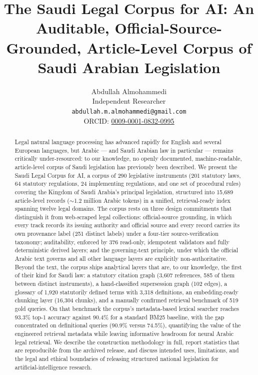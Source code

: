 \documentclass[sn-basic]{sn-jnl}%
\title{The Saudi Legal Corpus for AI: An Auditable,
Official-Source-Grounded, Article-Level Corpus of Saudi Arabian
Legislation}
\author*[1]{\fnm{Abdullah} \sur{Almohammedi}}\email{abdullah.m.almohammedi@gmail.com}
\affil[1]{\orgname{Independent Researcher}}
\author{Abdullah Almohammedi \\
    Independent Researcher \\
    \texttt{abdullah.m.almohammedi@gmail.com} \\
    ORCID: \href{https://orcid.org/0009-0001-0832-0995}{0009-0001-0832-0995}}
\date{}
\newcommand{\corpusname}{Saudi Legal Corpus for AI}
\begin{document}
\maketitle

\begin{abstract}
Legal natural language processing has advanced rapidly for English and
several European languages, but Arabic --- and Saudi Arabian law in
particular --- remains critically under-resourced: to our knowledge, no
openly documented, machine-readable, article-level corpus of Saudi
legislation has previously been described. We present the \corpusname, a
corpus of 290 legislative instruments (201 statutory laws, 64 statutory
regulations, 24 implementing regulations, and one set of procedural rules)
covering the Kingdom of Saudi Arabia's principal legislation, structured
into 15{,}689 article-level records ($\sim$1.2 million Arabic tokens) in a
unified, retrieval-ready index spanning twelve legal domains. The corpus
rests on three design commitments that distinguish it from web-scraped
legal collections: official-source grounding, in which every track records
its issuing authority and official source and every record carries its own
provenance label (251 distinct labels) under a four-tier source-verification
taxonomy; auditability, enforced by 376 read-only, idempotent validators and
fully deterministic derived layers; and the governing-text principle, under
which the official Arabic text governs and all other language layers are
explicitly non-authoritative. Beyond the text, the corpus ships analytical
layers that are, to our knowledge, the first of their kind for Saudi law: a
statutory citation graph (3{,}607 references, 585 of them between distinct
instruments), a hand-classified supersession graph (102 edges), a glossary
of 1{,}920 statutorily defined terms with 3{,}318 definitions, an
embedding-ready chunking layer (16{,}304 chunks), and a manually confirmed
retrieval benchmark of 519 gold queries. On that benchmark the corpus's
metadata-based lexical searcher reaches 93.3\% top-1 accuracy against 90.4\%
for a standard BM25 baseline, with the gap concentrated on definitional
queries (90.9\% versus 74.5\%), quantifying the value of the engineered
retrieval metadata while leaving informative headroom for neural Arabic
legal retrieval. We describe the construction methodology in full, report
statistics that are reproducible from the archived release, and discuss
intended uses, limitations, and the legal and ethical boundaries of
releasing structured national legislation for artificial-intelligence
research.
\end{abstract}
\end{document}
